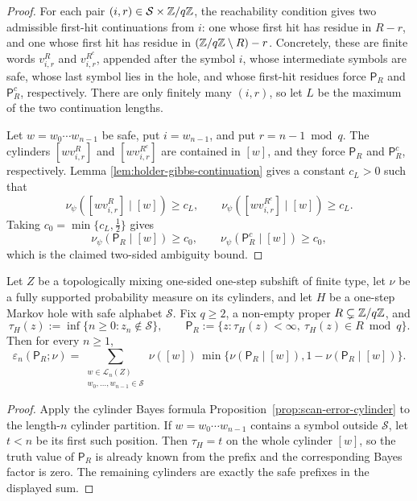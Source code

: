 \begin{proof}
For each pair \((i,r)\in\mathcal S\times\mathbb{Z}/q\mathbb{Z}\), the reachability
condition gives two admissible first-hit continuations from \(i\): one
whose first hit has residue in \(R-r\), and one whose first hit has
residue in \((\mathbb{Z}/q\mathbb{Z}\setminus R)-r\).  Concretely, these are finite
words \(v^{R}_{i,r}\) and \(v^{R^c}_{i,r}\), appended after the symbol
\(i\), whose intermediate symbols are safe, whose last symbol lies in
the hole, and whose first-hit residues force \(\mathsf P_R\) and
\(\mathsf P_R^c\), respectively.  There are only finitely many
\((i,r)\), so let \(L\) be the maximum of the two continuation lengths.

Let \(w=w_0\cdots w_{n-1}\) be safe, put \(i=w_{n-1}\), and put
\(r=n-1\bmod q\).  The cylinders \([wv^{R}_{i,r}]\) and
\([wv^{R^c}_{i,r}]\) are contained in \([w]\), and they force
\(\mathsf P_R\) and \(\mathsf P_R^c\), respectively.  Lemma
\ref{lem:holder-gibbs-continuation} gives a constant \(c_L>0\) such that
\[
  \nu_\psi([wv^{R}_{i,r}]\mid[w])\geq c_L,
  \qquad
  \nu_\psi([wv^{R^c}_{i,r}]\mid[w])\geq c_L .
\]
Taking \(c_0=\min\{c_L,\tfrac12\}\) gives
\[
  \nu_\psi(\mathsf P_R\mid[w])\geq c_0,
  \qquad
  \nu_\psi(\mathsf P_R^c\mid[w])\geq c_0,
\]
which is the claimed two-sided ambiguity bound.
\end{proof}

\begin{lemma}
\label{lem:holder-safe-prefix-bayes-decomposition}
Let \(Z\) be a topologically mixing one-sided one-step subshift of finite
type, let \(\nu\) be a fully supported probability measure on its
cylinders, and let \(H\) be a one-step Markov hole with safe alphabet
\(\mathcal S\).  Fix \(q\geq2\), a non-empty proper
\(R\subsetneq\mathbb{Z}/q\mathbb{Z}\), and
\[
  \tau_H(z):=\inf\{n\geq0:z_n\notin\mathcal S\},
  \qquad
  \mathsf P_R:=\{z:\tau_H(z)<\infty,\ \tau_H(z)\in R\bmod q\}.
\]
Then for every \(n\geq1\),
\[
  \varepsilon_n(\mathsf P_R;\nu)
  =
  \sum_{\substack{w\in\mathcal L_n(Z)\\
                  w_0,\ldots,w_{n-1}\in\mathcal S}}
    \nu([w])\,
    \min\{
      \nu(\mathsf P_R\mid[w]),
      1-\nu(\mathsf P_R\mid[w])
    \}.
\]
\end{lemma}

\begin{proof}
Apply the cylinder Bayes formula
Proposition~\ref{prop:scan-error-cylinder} to the length-\(n\) cylinder
partition.  If \(w=w_0\cdots w_{n-1}\) contains a symbol outside
\(\mathcal S\), let \(t<n\) be its first such position.  Then
\(\tau_H=t\) on the whole cylinder \([w]\), so the truth value of
\(\mathsf P_R\) is already known from the prefix and the corresponding
Bayes factor is zero.  The remaining cylinders are exactly the safe
prefixes in the displayed sum.
\end{proof}

